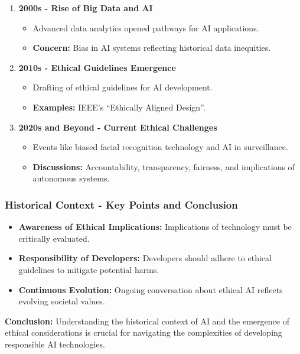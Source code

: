 \documentclass{beamer}
\begin{document}
\begin{frame}[fragile]
\begin{enumerate}
        \item \textbf{2000s - Rise of Big Data and AI}
        \begin{itemize}
            \item Advanced data analytics opened pathways for AI applications.
            \item \textbf{Concern:} Bias in AI systems reflecting historical data inequities.
        \end{itemize}
        
        \item \textbf{2010s - Ethical Guidelines Emergence}
        \begin{itemize}
            \item Drafting of ethical guidelines for AI development.
            \item \textbf{Examples:} IEEE’s “Ethically Aligned Design”.
        \end{itemize}
        
        \item \textbf{2020s and Beyond - Current Ethical Challenges}
        \begin{itemize}
            \item Events like biased facial recognition technology and AI in surveillance.
            \item \textbf{Discussions:} Accountability, transparency, fairness, and implications of autonomous systems.
        \end{itemize}
    \end{enumerate}
\end{frame}

\begin{frame}[fragile]
    \frametitle{Historical Context - Key Points and Conclusion}
    \begin{itemize}
        \item \textbf{Awareness of Ethical Implications:} Implications of technology must be critically evaluated.
        \item \textbf{Responsibility of Developers:} Developers should adhere to ethical guidelines to mitigate potential harms.
        \item \textbf{Continuous Evolution:} Ongoing conversation about ethical AI reflects evolving societal values.
    \end{itemize}
    
    \textbf{Conclusion:}
    Understanding the historical context of AI and the emergence of ethical considerations is crucial for navigating 
    the complexities of developing responsible AI technologies.
\end{frame}
\end{document}
